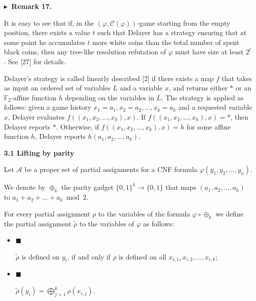 \par\medskip\noindent\textbf{
$\blacktriangleright$ Remark 17.
}\par



It is easy to see that if, in the $(\varphi,\mathcal{C}(\varphi))$-game starting from
the empty position, there exists a value $t$ such that Delayer has a strategy ensuring
that at some point he accumulates $t$ more white coins than the total number of spent
black coins, then any tree-like resolution refutation of $\varphi$ must have
size at least $2^{t}$. See [27] for details.\par




Delayer’s strategy is called linearly described [2] if there exists a map $f$
that takes as input an ordered set of variables $L$ and a variable $x$, and returns either
$*$ or an $\mathbb{F}_{2}$-affine function $h$ depending on the variables in $L$.
The strategy is applied as follows: given a game history $x_{1}=a_{1},x_{2}=a_{2},\dots,x_{k}=a_{k}$
and a requested variable $x$, Delayer evaluates $f((x_{1},x_{2},\dots,x_{k}),x)$.
If $f((x_{1},x_{2},\dots,x_{k}),x)=*$, then Delayer reports $*$.
Otherwise, if $f((x_{1},x_{2},\dots,x_{k}),x)=h$ for some affine function $h$, Delayer reports
$h(a_{1},a_{2},\dots,a_{k})$.\par


\par\medskip\noindent\textbf{
3.1 Lifting by parity}\par


Let $\mathcal{A}$ be a proper set of partial assignments for a CNF formula
$\varphi(y_{1},y_{2},\dots,y_{n})$.\par



We denote by $\oplus_{k}$ the parity gadget $\{0,1\}^{k}\to\{0,1\}$ that maps
$(a_{1},a_{2},\dots,a_{k})$ to $a_{1}+a_{2}+\dots+a_{k}\bmod 2$.\par



For every partial assignment $\rho$ to the variables of the formula $\varphi\circ\oplus_{k}$
we define the partial assignment $\tilde{\rho}$ to the variables of $\varphi$ as follows:\par


\begin{itemize}


\item 
$\blacksquare$ 


$\tilde{\rho}$ is defined on $y_{i}$, if and only if $\rho$ is defined on all
$x_{i,1},x_{i,2},\dots,x_{i,k}$;\par





\item 
$\blacksquare$ 


$\tilde{\rho}(y_{i})=\bigoplus_{j=1}^{k}\rho(x_{i,j})$.\par





\end{itemize}



